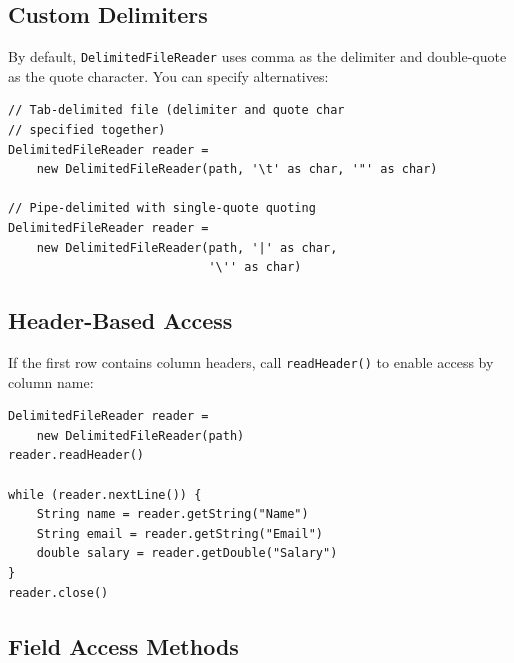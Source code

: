 \subsection{Custom Delimiters}

By default, \texttt{DelimitedFileReader} uses comma as the delimiter and double-quote as the quote character.  You can specify alternatives:

\begin{lstlisting}[style=groovy]
// Tab-delimited file (delimiter and quote char
// specified together)
DelimitedFileReader reader =
    new DelimitedFileReader(path, '\t' as char, '"' as char)

// Pipe-delimited with single-quote quoting
DelimitedFileReader reader =
    new DelimitedFileReader(path, '|' as char,
                            '\'' as char)
\end{lstlisting}

\subsection{Header-Based Access}

If the first row contains column headers, call \texttt{readHeader()} to enable access by column name:

\begin{lstlisting}[style=groovy]
DelimitedFileReader reader =
    new DelimitedFileReader(path)
reader.readHeader()

while (reader.nextLine()) {
    String name = reader.getString("Name")
    String email = reader.getString("Email")
    double salary = reader.getDouble("Salary")
}
reader.close()
\end{lstlisting}

\subsection{Field Access Methods}

